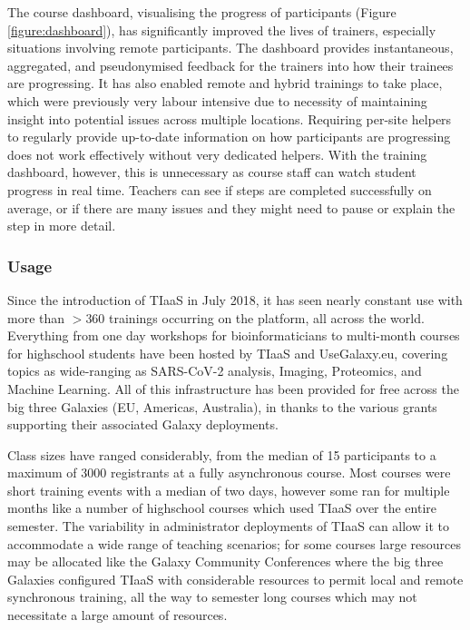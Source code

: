 \documentclass[a4paper,num-refs]{oup-contemporary}
\begin{document}
The course dashboard, visualising the progress of participants (Figure \ref{figure:dashboard}), has significantly improved the lives of trainers, especially situations involving remote participants. The dashboard provides instantaneous, aggregated, and pseudonymised feedback for the trainers into how their trainees are progressing. It has also enabled remote and hybrid trainings to take place, which were previously very labour intensive due to necessity of maintaining insight into potential issues across multiple locations. Requiring per-site helpers to regularly provide up-to-date information on how participants are progressing does not work effectively without very dedicated helpers. With the training dashboard, however, this is unnecessary as course staff can watch student progress in real time. Teachers can see if steps are completed successfully on average, or if there are many issues and they might need to pause or explain the step in more detail.

\subsubsection{Usage}
Since the introduction of TIaaS in July 2018, it has seen nearly constant use with more than $>$360 trainings occurring on the platform, all across the world.%
Everything from one day workshops for bioinformaticians to multi-month courses for highschool students have been hosted by TIaaS and UseGalaxy.eu, covering topics as wide-ranging as SARS-CoV-2 analysis, Imaging, Proteomics, and Machine Learning. All of this infrastructure has been provided for free across the big three Galaxies (EU, Americas, Australia), in thanks to the various grants supporting their associated Galaxy deployments.


Class sizes have ranged considerably, from the median of 15 participants to a maximum of 3000 registrants at a fully asynchronous course. Most courses were short training events with a median of two days, however some ran for multiple months like a number of highschool courses which used TIaaS over the entire semester. The variability in administrator deployments of TIaaS can allow it to accommodate a wide range of teaching scenarios; for some courses large resources may be allocated like the Galaxy Community Conferences where the big three Galaxies configured TIaaS with considerable resources to permit local and remote synchronous training, all the way to semester long courses which may not necessitate a large amount of resources.
\end{document}
